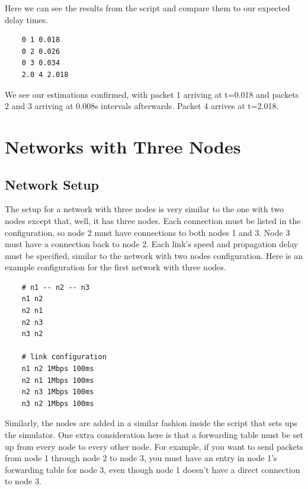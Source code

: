 \documentclass[11pt]{article}
\begin{document}
Here we can see the results from the script and compare them to our expected delay times.

\vspace{5mm}

\begin{lstlisting}
    0 1 0.018
    0 2 0.026
    0 3 0.034
    2.0 4 2.018
\end{lstlisting}

\vspace{5mm}

We see our estimations confirmed, with packet 1 arriving at t=0.018 and packets 2 and 3 arriving at 0.008s intervals afterwards. Packet 4 arrives at t=2.018.

\section{Networks with Three Nodes}

\subsection{Network Setup}

The setup for a network with three nodes is very similar to the one with two nodes except that, well, it has three nodes. Each connection must be listed in the configuration, so node 2 must have connections to both nodes 1 and 3. Node 3 must have a connection back to node 2. Each link's speed and propagation delay must be specified, similar to the network with two nodes configuration. Here is an example configuration for the first network with three nodes.

\vspace{5mm}

\begin{lstlisting}
    # n1 -- n2 -- n3
    n1 n2
    n2 n1
    n2 n3
    n3 n2

    # link configuration
    n1 n2 1Mbps 100ms
    n2 n1 1Mbps 100ms
    n2 n3 1Mbps 100ms
    n3 n2 1Mbps 100ms
\end{lstlisting}

\vspace{5mm}

Similarly, the nodes are added in a similar fashion inside the script that sets ups the simulator. One extra consideration here is that a forwarding table must be set up from every node to every other node. For example, if you want to send packets from node 1 through node 2 to node 3, you must have an entry in node 1's forwarding table for node 3, even though node 1 doesn't have a direct connection to node 3.
\end{document}
